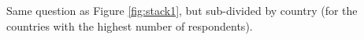\label{fig:stack3}

Same question as Figure \ref{fig:stack1}, but sub-divided by country (for the countries with the highest number of respondents).